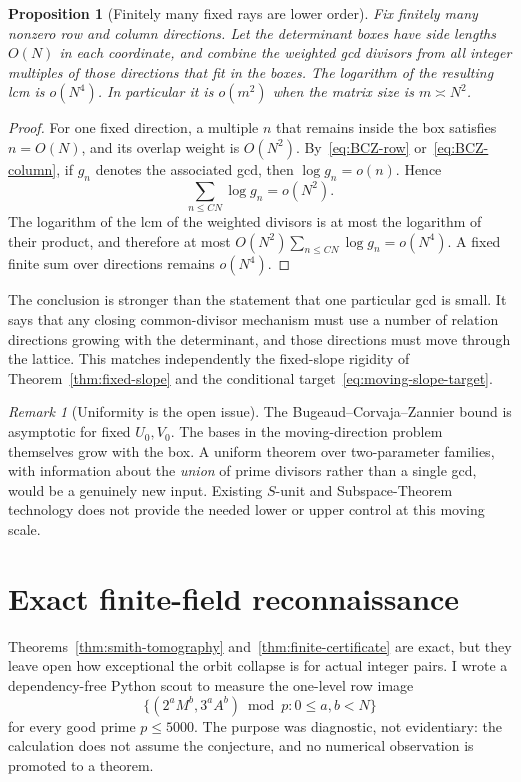 \documentclass[11pt]{article}
\newtheorem{proposition}[theorem]{Proposition}
\theoremstyle{definition}
\theoremstyle{remark}
\newtheorem{remark}[theorem]{Remark}
\begin{document}
\begin{proposition}[Finitely many fixed rays are lower order]
\label{prop:fixed-rays}
Fix finitely many nonzero row and column directions.  Let the determinant boxes have side lengths $O(N)$ in each coordinate, and combine the weighted gcd divisors from \emph{all} integer multiples of those directions that fit in the boxes.  The logarithm of the resulting lcm is $o(N^4)$.  In particular it is $o(m^2)$ when the matrix size is $m\asymp N^2$.
\end{proposition}

\begin{proof}
For one fixed direction, a multiple $n$ that remains inside the box satisfies $n=O(N)$, and its overlap weight is $O(N^2)$.  By~\eqref{eq:BCZ-row} or~\eqref{eq:BCZ-column}, if $g_n$ denotes the associated gcd, then $\log g_n=o(n)$.  Hence
\[
 \sum_{n\le C N}\log g_n=o(N^2).
\]
The logarithm of the lcm of the weighted divisors is at most the logarithm of their product, and therefore at most
$O(N^2)\sum_{n\le C N}\log g_n=o(N^4)$.  A fixed finite sum over directions remains $o(N^4)$.
\end{proof}

The conclusion is stronger than the statement that one particular gcd is small.  It says that any closing common-divisor mechanism must use a number of relation directions growing with the determinant, and those directions must move through the lattice.  This matches independently the fixed-slope rigidity of Theorem~\ref{thm:fixed-slope} and the conditional target~\eqref{eq:moving-slope-target}.

\begin{remark}[Uniformity is the open issue]
The Bugeaud--Corvaja--Zannier bound is asymptotic for fixed $U_0,V_0$.  The bases in the moving-direction problem themselves grow with the box.  A uniform theorem over two-parameter families, with information about the \emph{union} of prime divisors rather than a single gcd, would be a genuinely new input.  Existing $S$-unit and Subspace-Theorem technology does not provide the needed lower or upper control at this moving scale.
\end{remark}

\section{Exact finite-field reconnaissance}
\label{sec:computation}

Theorems~\ref{thm:smith-tomography} and~\ref{thm:finite-certificate} are exact, but they leave open how exceptional the orbit collapse is for actual integer pairs.  I wrote a dependency-free Python scout to measure the one-level row image
\[
 \{(2^aM^b,3^aA^b)\bmod p:0\le a,b<N\}
\]
for every good prime $p\le5000$.  The purpose was diagnostic, not evidentiary: the calculation does not assume the conjecture, and no numerical observation is promoted to a theorem.
\end{document}
